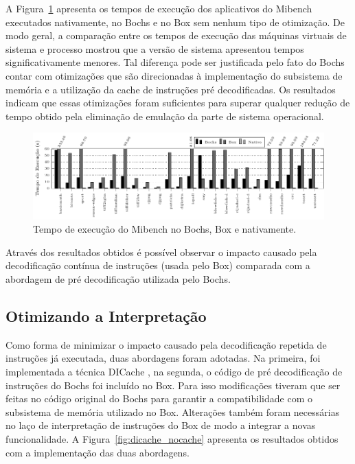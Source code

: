 \documentclass[11pt,twoside]{article}
\begin{document}
A Figura~\ref{fig:bochs_nocache_nativo} apresenta os tempos de execução dos 
aplicativos do Mibench executados nativamente, no Bochs e no Box sem nenhum 
tipo de otimização. De modo geral, a comparação entre os tempos de execução das 
máquinas virtuais de sistema e processo mostrou que a versão de sistema apresentou 
tempos significativamente menores. Tal diferença pode ser justificada pelo fato do
Bochs contar com otimizações que são direcionadas à implementação do subsistema de 
memória e a utilização da cache de instruções pré decodificadas. Os resultados 
indicam que essas otimizações foram suficientes para superar qualquer redução de 
tempo obtido pela eliminação de emulação da parte de sistema operacional. 

\begin{figure}[h]
	\centering
	\includegraphics[width=1.0\textwidth]{figures/bochs_nocache_nativo}
	\caption{Tempo de execução do Mibench no Bochs, Box e nativamente.}
	\label{fig:bochs_nocache_nativo}
\end{figure}

Através dos resultados obtidos é possível observar o impacto causado pela
decodificação contínua de instruções (usada pelo Box) comparada com a 
abordagem de pré decodificação utilizada pelo Bochs.

\subsection{Otimizando a Interpretação}

Como forma de minimizar o impacto causado pela decodificação repetida de
instruções já executada, duas abordagens foram adotadas. Na primeira, foi
implementada a técnica DICache \cite{dicache}, na segunda, o código de
pré decodificação de instruções do Bochs foi incluído no Box. Para isso
modificações tiveram que ser feitas no código original do Bochs para garantir a
compatibilidade com o subsistema de memória utilizado no Box. Alterações também
foram necessárias no laço de interpretação de instruções do Box de modo a
integrar a novas funcionalidade. A Figura~\ref{fig:dicache_nocache} apresenta os
resultados obtidos com a implementação das duas abordagens.
\end{document}

